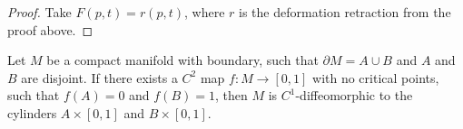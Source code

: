 \begin{proof}
   Take $F(p,t) = r(p, t)$, where $r$ is the deformation retraction from the 
   proof above.
\end{proof}

\begin{corollary}[Hirsch]
   Let $M$ be a compact manifold with boundary, such that $\partial M = A \cup B$
   and $A$ and $B$ are disjoint. If there exists a $C^2$ map $f: M \rightarrow [0,1]$
   with no critical points, such that $f(A) = 0$ and $f(B) = 1$, then $M$ is 
   $C^1$-diffeomorphic to the cylinders $A \times [0, 1]$ and $B \times [0, 1]$.
\end{corollary}
